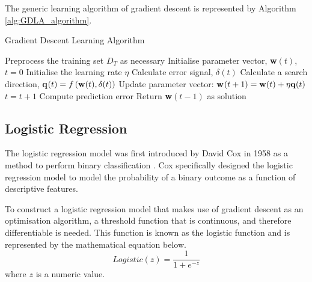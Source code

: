 \documentclass[10pt, conference]{IEEEtran}
\begin{document}
The generic learning algorithm of gradient descent is represented by Algorithm \ref{alg:GDLA_algorithm}.
\begin{algorithm}[H]
    \caption{Gradient Descent Learning Algorithm}
    \label{alg:GDLA_algorithm}
    \begin{algorithmic}[1]
        \State Preprocess the training set $D_T$ as necessary
        \State Initialise parameter vector, \textbf{w}$(t)$, $t=0$
        \State Initialise the learning rate $\eta$
                \State Calculate error signal, $\delta(t)$
                \State Calculate a search direction, \textbf{q}$(t) = f\left( \text{\textbf{w}}(t), \delta(t) \right)$
                \State Update parameter vector: \textbf{w}$(t+1) = \text{\textbf{w}}(t) + \eta \text{\textbf{q}}(t)$
            \EndFor
            \State $t = t + 1$
            \State Compute prediction error
        \EndWhile
        \State Return \textbf{w}$(t-1)$ as solution
    \end{algorithmic}
\end{algorithm}

\subsection{Logistic Regression}

The logistic regression model was first introduced by David Cox in 1958 as a method to perform binary
classification \cite{logistic_regression_ref}. Cox specifically designed the logistic regression
model to model the probability of a binary outcome as a function of descriptive features.

To construct a logistic regression model that makes use of gradient descent as an optimisation
algorithm, a threshold function that is continuous, and therefore differentiable is needed. This function
is known as the logistic function and is represented by the mathematical equation below.
\begin{equation}
    Logistic(z) = \frac{1}{1 + e^{-z}} \label{eq: logistic_function}
\end{equation}
where $z$ is a numeric value.
\end{document}
